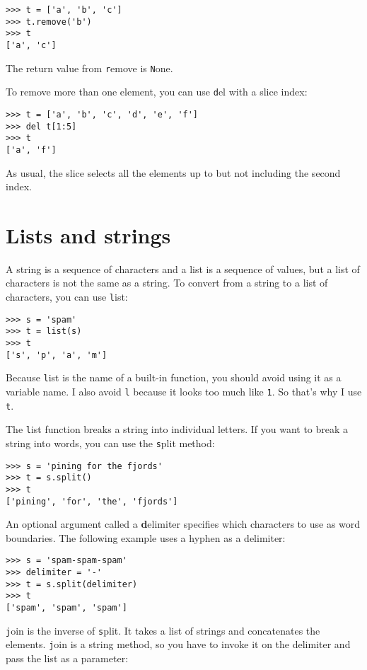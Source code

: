 \documentclass[
DIV=11,
fontsize=12,
twoside,
headinclude=false,
titlepage=firstiscover,
abstract=true,
headsepline=true,
footsepline=true,
chapterprefix=true, %
headings=big,
bibliography=totoc,%
captions=tableheading
]{scrbook}
\theoremstyle{definition}
\begin{document}
\begin{lstlisting}
>>> t = ['a', 'b', 'c']
>>> t.remove('b')
>>> t
['a', 'c']
\end{lstlisting}
%
The return value from {\texttt remove} is {\texttt None}.

To remove more than one element, you can use {\texttt del} with
a slice index:

\begin{lstlisting}
>>> t = ['a', 'b', 'c', 'd', 'e', 'f']
>>> del t[1:5]
>>> t
['a', 'f']
\end{lstlisting}
%
As usual, the slice selects all the elements up to but not
including the second index.



\section{Lists and strings}

A string is a sequence of characters and a list is a sequence
of values, but a list of characters is not the same as a
string.  To convert from a string to a list of characters,
you can use {\texttt list}:

\begin{lstlisting}
>>> s = 'spam'
>>> t = list(s)
>>> t
['s', 'p', 'a', 'm']
\end{lstlisting}
%
Because {\texttt list} is the name of a built-in function, you should
avoid using it as a variable name.  I also avoid {\texttt l} because
it looks too much like {\texttt 1}.  So that's why I use {\texttt t}.

The {\texttt list} function breaks a string into individual letters.  If
you want to break a string into words, you can use the {\texttt split}
method:

\begin{lstlisting}
>>> s = 'pining for the fjords'
>>> t = s.split()
>>> t
['pining', 'for', 'the', 'fjords']
\end{lstlisting}
%
An optional argument called a {\textbf delimiter} specifies which
characters to use as word boundaries.
The following example
uses a hyphen as a delimiter:

\begin{lstlisting}
>>> s = 'spam-spam-spam'
>>> delimiter = '-'
>>> t = s.split(delimiter)
>>> t
['spam', 'spam', 'spam']
\end{lstlisting}
%
{\texttt join} is the inverse of {\texttt split}.  It
takes a list of strings and
concatenates the elements.  {\texttt join} is a string method,
so you have to invoke it on the delimiter and pass the
list as a parameter:
\end{document}

